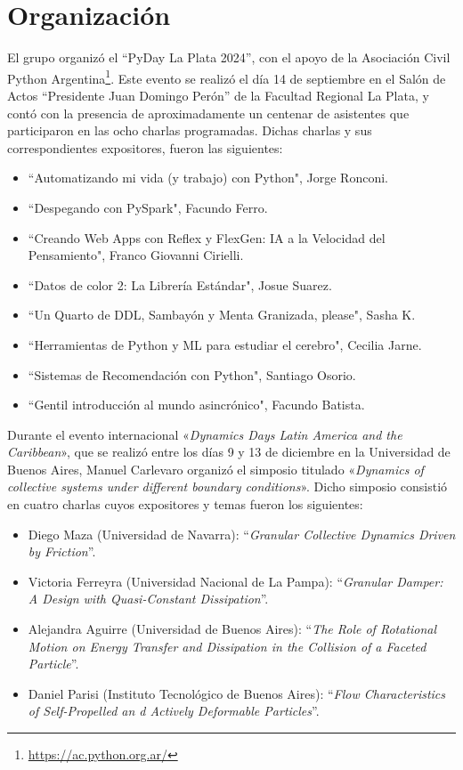 \documentclass[a4paper,11pt,twoside,final,titlepage,onecolumn,openright]{report}
\begin{document}
\section{Organización}
\vspace{0.5cm}

El grupo organizó el ``PyDay La Plata 2024'', con el apoyo de la Asociación Civil Python Argentina\footnote{\url{https://ac.python.org.ar/}}. Este evento se realizó el día 14 de septiembre en el Salón de Actos ``Presidente Juan Domingo Perón'' de la Facultad Regional La Plata, y contó con la presencia de aproximadamente un centenar de asistentes que participaron en las ocho charlas programadas. Dichas charlas y sus correspondientes expositores, fueron las siguientes:
\begin{itemize}
\item ``Automatizando mi vida (y trabajo) con Python", Jorge Ronconi.
\item ``Despegando con PySpark", Facundo Ferro.
\item ``Creando Web Apps con Reflex y FlexGen: IA a la Velocidad del Pensamiento", Franco Giovanni Cirielli.
\item ``Datos de color 2: La Librería Estándar", Josue Suarez.
\item ``Un Quarto de DDL, Sambayón y Menta Granizada, please", Sasha K.
\item ``Herramientas de Python y ML para estudiar el cerebro", Cecilia Jarne.
\item ``Sistemas de Recomendación con Python", Santiago Osorio.
\item ``Gentil introducción al mundo asincrónico", Facundo Batista.
\end{itemize}

Durante el evento internacional «\textit{Dynamics Days Latin America and the Caribbean}», que se realizó entre los días 9 y 13 de diciembre en la Universidad de Buenos Aires, Manuel Carlevaro organizó el simposio titulado «\textit{Dynamics of collective systems under different boundary conditions}». Dicho simposio consistió en cuatro charlas cuyos expositores y temas fueron los siguientes:
\begin{itemize}
  \item Diego Maza (Universidad de Navarra): ``\textit{Granular Collective Dynamics Driven by Friction}''.
  \item Victoria Ferreyra (Universidad Nacional de La Pampa): ``\textit{Granular Damper: A Design with Quasi-Constant Dissipation}''.
  \item Alejandra Aguirre (Universidad de Buenos Aires): ``\textit{The Role of Rotational Motion on Energy Transfer and Dissipation in the Collision of a Faceted Particle}''.
  \item Daniel Parisi (Instituto Tecnológico de Buenos Aires): ``\textit{Flow Characteristics of Self-Propelled an d Actively Deformable Particles}''.
\end{itemize}
\end{document}
